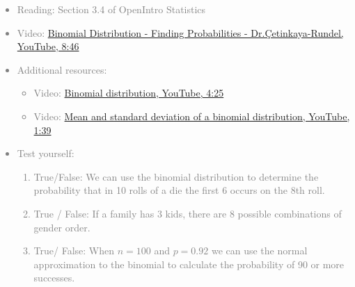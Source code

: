 \documentclass[11pt]{article}
\newcommand{\gray}[1]{\textcolor{gray}{#1}}
\begin{document}
\gray{
{\it
\vspace{-0.75cm}
\begin{itemize}
\renewcommand{\labelitemi}{{\textcolor{oiB}{$\ast$}}}
\item Reading: Section 3.4 of OpenIntro Statistics
\item Video: \href{http://www.youtube.com/watch?v=tKmyzhvgudw}{Binomial Distribution - Finding Probabilities - Dr.\c{C}etinkaya-Rundel, YouTube, 8:46}
\item Additional resources:
\begin{itemize}
\item Video: \href{http://www.youtube.com/watch?v=oYeJBdCGwxk&list=PL568547ACA9211CCA&index=28&feature=plpp_video}{Binomial distribution, YouTube, 4:25}
\item Video: \href{http://www.youtube.com/watch?v=0er3EiM-bpg&list=PL568547ACA9211CCA&index=27&feature=plpp_video}{Mean and standard deviation of a binomial distribution, YouTube, 1:39} 
\end{itemize}
\item Test yourself: 
\begin{enumerate}
\item True/False: We can use the binomial distribution to determine the probability that in 10 rolls of a die the first 6 occurs on the 8th roll.
\item True / False: If a family has 3 kids, there are 8 possible combinations of gender order.
\item True/ False: When $n = 100$ and $p = 0.92$ we can use the normal approximation to the binomial to calculate the probability of 90 or more successes.
\end{enumerate}
\end{itemize}
}}
\end{document}
